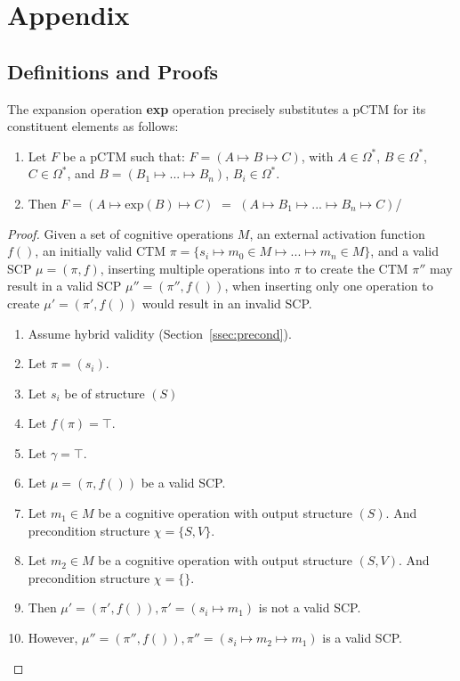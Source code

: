 \chapter*{Appendix} \label{chp:appendix}
\section*{Definitions and Proofs}
\begin{definition} \label{def:exp}
The expansion operation \textbf{exp} operation precisely substitutes a pCTM for its constituent elements as follows: 
\begin{enumerate}
\item Let $F$ be a pCTM such that: $F=(A \longmapsto B \longmapsto C)$, with $A \in \Omega^*$, $B \in \Omega^*$, $C \in \Omega^*$, and $B = (B_1 \longmapsto ... \longmapsto B_n)$, $B_i \in \Omega^*$. 
\item Then $F=(A \longmapsto \text{exp}(B) \longmapsto C)$ $=$ $(A \longmapsto B_1 \longmapsto ... \longmapsto B_n \longmapsto C)$/
\end{enumerate}
\end{definition}

\begin{proof} \label{proof:insertionSearch}
Given a set of cognitive operations $M$, an external activation function $f()$, an initially valid CTM $\pi=\{s_i \longmapsto m_0\in M \longmapsto ... \longmapsto m_n\in M\}$, and a valid SCP $\mu=(\pi,f)$, inserting multiple operations into $\pi$ to create the CTM $\pi''$ may result in a valid SCP $\mu''=(\pi'',f())$, when inserting only one operation to create $\mu'=(\pi',f())$ would result in an invalid SCP.

\begin{enumerate}
\item Assume hybrid validity (Section~\ref{ssec:precond}).
\item Let $\pi=(s_i)$.
\item Let $s_i$ be of structure $(S)$
\item Let $f(\pi)=\top$.
\item Let $\gamma = \top$.
\item Let $\mu=(\pi,f())$ be a valid SCP.
\item Let $m_1 \in M$ be a cognitive operation with output structure $(S)$. And precondition structure $\chi=\{S,V\}$.
\item Let $m_2 \in M$ be a cognitive operation with output structure $(S,V)$. And precondition structure $\chi=\{\}$.
\item Then $\mu'=(\pi',f()), \pi'=(s_i \longmapsto m_1)$ is not a valid SCP.
\item However, $\mu''=(\pi'',f()), \pi''=(s_i \longmapsto m_2 \longmapsto m_1)$ is a valid SCP.
\end{enumerate}
\end{proof}








